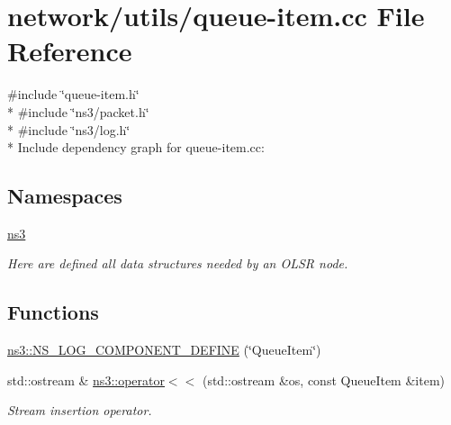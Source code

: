\hypertarget{queue-item_8cc}{}\section{network/utils/queue-\/item.cc File Reference}
\label{queue-item_8cc}
{\ttfamily \#include \char`\"{}queue-\/item.\+h\char`\"{}}\\*
{\ttfamily \#include \char`\"{}ns3/packet.\+h\char`\"{}}\\*
{\ttfamily \#include \char`\"{}ns3/log.\+h\char`\"{}}\\*
Include dependency graph for queue-\/item.cc\+:
\subsection*{Namespaces}
\begin{DoxyCompactItemize}
\item 
 \hyperlink{namespacens3}{ns3}
\begin{DoxyCompactList}\small\item\em Here are defined all data structures needed by an O\+L\+SR node. \end{DoxyCompactList}\end{DoxyCompactItemize}
\subsection*{Functions}
\begin{DoxyCompactItemize}
\item 
\hyperlink{namespacens3_a2d6b16aabf0a39e3df823d16d45d1822}{ns3\+::\+N\+S\+\_\+\+L\+O\+G\+\_\+\+C\+O\+M\+P\+O\+N\+E\+N\+T\+\_\+\+D\+E\+F\+I\+NE} (\char`\"{}Queue\+Item\char`\"{})
\item 
std\+::ostream \& \hyperlink{namespacens3_ab62953d425e1cc0707cfed90a65300c2}{ns3\+::operator$<$$<$} (std\+::ostream \&os, const Queue\+Item \&item)
\begin{DoxyCompactList}\small\item\em Stream insertion operator. \end{DoxyCompactList}\end{DoxyCompactItemize}
